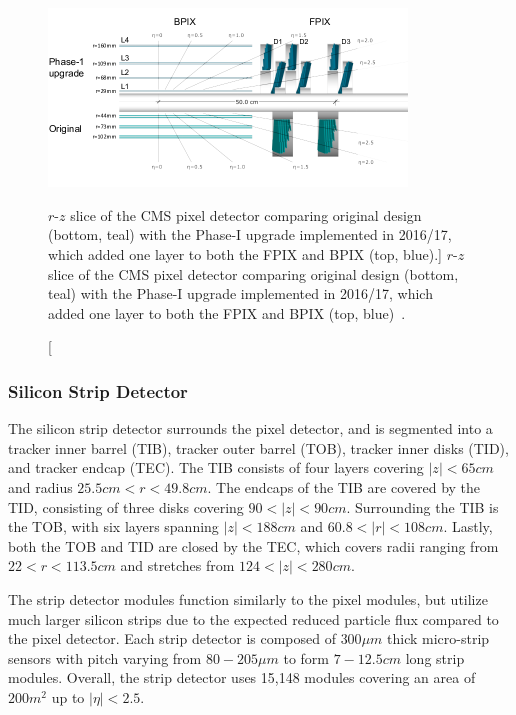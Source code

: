 \begin{figure}[htbp]
	\centering
	\includegraphics[width=0.85\textwidth]{figs/03_experiment/20120828_01_pixel_phase1_largesharp.png}
	\caption
	[$r$-$z$ slice of the CMS pixel detector comparing original design (bottom, teal) with the Phase-I upgrade implemented in 2016/17, which added one layer to both the FPIX and BPIX (top, blue).]
	{$r$-$z$ slice of the CMS pixel detector comparing original design (bottom, teal) with the Phase-I upgrade implemented in 2016/17, which added one layer to both the FPIX and BPIX (top, blue)~\cite{CMSPixelP1}.}
	\label{fig:pixel}
\end{figure}

\subsubsection{Silicon Strip Detector} \label{sec:CMS_strip}
The silicon strip detector surrounds the pixel detector, and is segmented into a tracker inner barrel (TIB), tracker outer barrel (TOB), tracker inner disks (TID), and tracker endcap (TEC). The TIB consists of four layers covering $\left|z\right|<65\unit{cm}$ and radius $25.5\unit{cm}<r<49.8\unit{cm}$. The endcaps of the TIB are covered by the TID, consisting of three disks covering $90<\left|z\right|<90\unit{cm}$. Surrounding the TIB is the TOB, with six layers spanning $\left|z\right|<188\unit{cm}$ and $60.8<\left|r\right|<108\unit{cm}$. Lastly, both the TOB and TID are closed by the TEC, which covers radii ranging from $22<r<113.5\unit{cm}$ and stretches from $124<\left|z\right|<280\unit{cm}$.

The strip detector modules function similarly to the pixel modules, but utilize much larger silicon strips due to the expected reduced particle flux compared to the pixel detector. Each strip detector is composed of $300\unit{\mu m}$ thick micro-strip sensors with pitch varying from $80-205\unit{\mu m}$ to form $7-12.5\unit{cm}$ long strip modules. Overall, the strip detector uses 15,148 modules covering an area of $200\unit{m^2}$ up to $\left|\eta\right|<2.5$.

